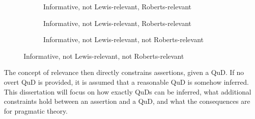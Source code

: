 \begin{figure}[H]\ContinuedFloat
	\begin{subfigure}[b]{.3\linewidth}
		\centering
		\caption{Informative, not Lewis-relevant, Roberts-relevant}
	\end{subfigure}\hfill
	\begin{subfigure}[b]{.3\linewidth}
		\centering
		\caption{Informative, not Lewis-relevant, Roberts-relevant}
	\end{subfigure}\hfill
	\begin{subfigure}[b]{.33\linewidth}
		\centering
		\caption{Informative, not Lewis-relevant, not Roberts-relevant}
	\end{subfigure}
\end{figure}


The concept of relevance then directly constrains assertions, given a QuD. If no overt QuD is provided, it is assumed that a reasonable QuD is somehow inferred. This dissertation will focus on how exactly QuDs can be inferred, what additional constraints hold between an assertion and a QuD, and what the consequences are for pragmatic theory.

